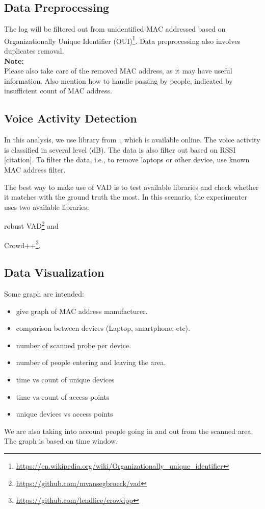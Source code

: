 \documentclass{article}
\begin{document}
\subsection{Data Preprocessing} %
\label{sub:data_preprocessing}
The log will be filtered out from unidentified MAC addressed based on Organizationally Unique Identifier (OUI)\footnote{\url{https://en.wikipedia.org/wiki/Organizationally_unique_identifier}}. Data preprocessing also involves duplicates removal.\\

\noindent
\textbf{Note:}\\
Please also take care of the removed MAC address, as it may have useful information.
Also mention how to handle passing by people, indicated by insufficient count of MAC address.

\subsection{Voice Activity Detection} %
\label{sub:voice_activity_detection}
In this analysis, we use library from~\cite{thesis070,thesis067}, which is available online. The voice activity is classified in several level (dB). The data is also filter out based on RSSI [citation]. To filter the data, i.e., to remove laptops or other device, use known MAC address filter.

The best way to make use of VAD is to test available libraries and check whether it matches with the ground truth the most. In this scenario, the experimenter uses two available libraries:
	\begin{enumerate*}[label={\alph*)}]
		\item robust VAD\footnote{\url{https://github.com/mvansegbroeck/vad}} and 
		\item Crowd++\footnote{\url{https://github.com/lendlice/crowdpp}}.
	\end{enumerate*}

\subsection{Data Visualization} %
\label{sub:data_visualization}
Some graph are intended:
\begin{itemize}
	\item give graph of MAC address manufacturer.
	\item comparison between devices (Laptop, smartphone, etc).
	\item number of scanned probe per device.
	\item number of people entering and leaving the area.
	\item time vs count of unique devices
	\item time vs count of access points
	\item unique devices vs access points
\end{itemize}
We are also taking into account people going in and out from the scanned area. The graph is based on time window.
\end{document}
